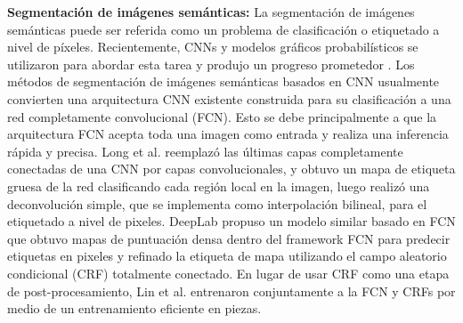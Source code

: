 \textbf{Segmentación de imágenes semánticas:} La segmentación de imágenes semánticas puede ser referida como un problema de clasificación o etiquetado a nivel de píxeles. Recientemente, CNNs y modelos gráficos probabilísticos se utilizaron para abordar esta tarea y produjo un progreso prometedor \cite{ZhengS,LiuZ,Long,ChenLC,LinG}. Los métodos de segmentación de imágenes semánticas basados en CNN usualmente convierten una arquitectura CNN existente construida para su clasificación a una red completamente convolucional (FCN). Esto se debe principalmente a que la arquitectura FCN acepta toda una imagen como entrada y realiza una inferencia rápida y precisa. Long et al. \cite{Long} reemplazó las últimas capas completamente conectadas de una CNN por capas convolucionales, y obtuvo un mapa de etiqueta gruesa de la red clasificando cada región local en la imagen, luego realizó una deconvolución simple, que se implementa como interpolación bilineal, para el etiquetado a nivel de pixeles. DeepLab \cite{ChenLC} propuso un modelo similar basado en FCN que obtuvo mapas de puntuación densa dentro del framework FCN  para predecir etiquetas en pixeles y refinado la etiqueta de mapa utilizando el campo aleatorio condicional (CRF) totalmente conectado. En lugar de usar CRF como una etapa de post-procesamiento, Lin et al. \cite{LinG} entrenaron conjuntamente a la FCN y CRFs por medio de un entrenamiento eficiente en piezas.

